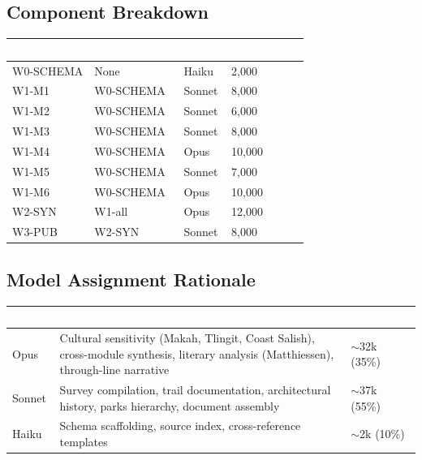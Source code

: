\documentclass[11pt,letterpaper]{article}
\newcommand{\tableheader}[1]{\textbf{\sffamily\textcolor{white}{#1}}}
\begin{document}
\subsection{Component Breakdown}

\begin{center}
\begin{tabularx}{\textwidth}{L{3cm}L{2.5cm}C{1.5cm}C{2cm}}
\toprule
{}
\tableheader{Component} & \tableheader{Dependencies} & \tableheader{Model} & \tableheader{Est. Tokens} \\
\midrule
W0-SCHEMA & None & Haiku & 2,000 \\
W1-M1 & W0-SCHEMA & Sonnet & 8,000 \\
W1-M2 & W0-SCHEMA & Sonnet & 6,000 \\
W1-M3 & W0-SCHEMA & Sonnet & 8,000 \\
W1-M4 & W0-SCHEMA & Opus & 10,000 \\
W1-M5 & W0-SCHEMA & Sonnet & 7,000 \\
W1-M6 & W0-SCHEMA & Opus & 10,000 \\
W2-SYN & W1-all & Opus & 12,000 \\
W3-PUB & W2-SYN & Sonnet & 8,000 \\
\bottomrule
\end{tabularx}
\end{center}

\subsection{Model Assignment Rationale}

\begin{center}
\begin{tabularx}{\textwidth}{C{1.5cm}XC{2cm}}
\toprule
{}
\tableheader{Model} & \tableheader{Rationale} & \tableheader{Allocation} \\
\midrule
Opus & Cultural sensitivity (Makah, Tlingit, Coast Salish), cross-module synthesis, literary analysis (Matthiessen), through-line narrative & $\sim$32k (35\%) \\
Sonnet & Survey compilation, trail documentation, architectural history, parks hierarchy, document assembly & $\sim$37k (55\%) \\
Haiku & Schema scaffolding, source index, cross-reference templates & $\sim$2k (10\%) \\
\bottomrule
\end{tabularx}
\end{center}
\end{document}
